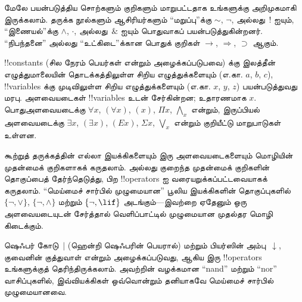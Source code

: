\documentclass[../../../include/open-logic-section]{subfiles}
\begin{document}

\begin{intro}
மேலே பயன்படுத்திய சொற்களும் குறிகளும் மாறுபட்டதாக உங்களுக்கு அறிமுகமாகி
இருக்கலாம். தருக்க நூல்களும் ஆசிரியர்களும் ``மறுப்பு''க்கு $\sim$, $\neg$,
அல்லது~! ஐயும், ``இணையல்''க்கு $\wedge$, $\cdot$, அல்லது~$\&$ ஐயும்
பொதுவாகப் பயன்படுத்துகின்றனர். ``நிபந்தனை'' அல்லது ``உட்கிடை''க்கான
பொதுக் குறிகள் $\rightarrow$, $\Rightarrow$, $\supset$ ஆகும்.

!!{constant}s (சில நேரம் பெயர்கள் என்றும் அழைக்கப்படுபவை) க்கு இலத்தீன்
எழுத்துமாலையின் தொடக்கத்திலுள்ள சிறிய எழுத்துக்களையும் (எ.கா. $a$, $b$, $c$),
!!{variable}s க்கு முடிவிலுள்ள சிறிய எழுத்துக்களையும் (எ.கா. $x$, $y$, $z$)
பயன்படுத்துவது மரபு. அளவையடைகள் !!{variable}s உடன் சேர்கின்றன; உதாரணமாக
$x$. பொதுஅளவையடைக்கு $\forall x$, $(\forall x)$, $(x)$, $\Pi x$,
$\bigwedge_x$ என்றும், இருப்பியல் அளவையடைக்கு $\exists x$, $(\exists
x)$, $(Ex)$, $\Sigma x$, $\bigvee_x$ என்றும் குறியீட்டு மாறுபாடுகள் உள்ளன.
\end{intro}

\begin{explain}
கூற்றுத் தருக்கத்தின் எல்லா இயக்கிகளையும் இரு அளவையடைகளையும் மொழியின்
முதன்மைக் குறிகளாகக் கருதலாம். அல்லது குறைந்த முதன்மைக் குறிகளின் தொகுப்பைத்
தேர்ந்தெடுத்து, பிற !!{operator}s ஐ வரையறுக்கப்பட்டவையாகக் கருதலாம்.
``மெய்மைச் சார்பில் முழுமையான'' பூலிய இயக்கிகளின் தொகுப்புகளில்
$\{ \lnot, \lor \}$, $\{ \lnot, \land \}$ மற்றும் $\{ \lnot,
\lif\}$ அடங்கும்---இவற்றை ஏதேனும் ஒரு அளவையடையுடன் சேர்த்தால்
வெளிப்பாட்டில் முழுமையான முதல்தர மொழி கிடைக்கும்.

ஷெஃபர் கோடு~$|$ (ஹென்றி ஷெஃபரின் பெயரால்) மற்றும் பியர்ஸின்
அம்பு~$\downarrow$, குவைனின் குத்துவாள் என்றும் அழைக்கப்படுவது, ஆகிய இரு
!!{operator}s உங்களுக்குத் தெரிந்திருக்கலாம். அவற்றின் வழக்கமான ``nand'' மற்றும்
``nor'' வாசிப்புகளில், இவ்வியக்கிகள் ஒவ்வொன்றும் தனியாகவே மெய்மைச் சார்பில்
முழுமையானவை.
\end{explain}
\end{document}

